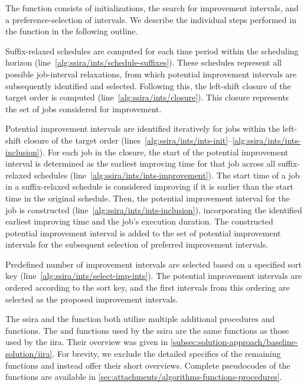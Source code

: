 The  function consists of initializations,
the search for improvement intervals, and a preference-selection of intervals.
We describe the individual steps performed in the function in the following outline.

\begin{steps}
    \item
        Suffix-relaxed schedules are computed for each time period within the scheduling horizon
        (line~\ref{alg:ssira/ints/schedule-suffixes}).
        These schedules represent all possible job-interval relaxations,
        from which potential improvement intervals are subsequently identified and selected.
        Following this, the left-shift closure of the target order is computed (line~\ref{alg:ssira/ints/closure}).
        This closure represents the set of jobs considered for improvement.

    \item
        Potential improvement intervals are identified iteratively
        for jobs within the left-shift closure of the target order
        (lines~\ref{alg:ssira/ints/ints-init}--\ref{alg:ssira/ints/ints-inclusion}).
        For each job in the closure,
        the start of the potential improvement interval is determined
        as the earliest improving time for that job across all suffix-relaxed schedules
        (line~\ref{alg:ssira/ints/ints-improvement}).
        The start time of a job in a suffix-relaxed schedule is considered improving
        if it is earlier than the start time in the original schedule.
        Then, the potential improvement interval for the job is constructed (line~\ref{alg:ssira/ints/ints-inclusion}),
        incorporating the identified earliest improving time and the job's execution duration.
        The constructed potential improvement interval is added to the set of potential improvement intervals
        for the subsequent selection of preferred improvement intervals.

    \item
        Predefined number of improvement intervals are selected based on a specified sort key
        (line~\ref{alg:ssira/ints/select-imp-ints}).
        The potential improvement intervals are ordered according to the sort key,
        and the first intervals from this ordering are selected as the proposed improvement intervals.
\end{steps}

The \ac{ssira} and the  function
both utilize multiple additional procedures and functions.
The 
and 
functions used by the \ac{ssira} are the same functions as those used by the \ac{iira}.
Their overview was given in \cref{subsec:solution-approach/baseline-solution/iira}.
For brevity, we exclude the detailed specifics of the
remaining functions and instead offer their short overviews.
Complete pseudocodes of the functions are available in \cref{sec:attachments/algorithms-functions-procedures}.

